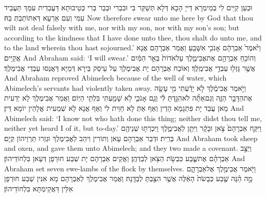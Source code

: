 {וּכְעַן קַיֵּים לִי בְּמֵימְרָא דַּייָ הָכָא דְּלָא תְּשַׁקַּר בִּי וּבִבְרִי וּבְבַר בְּרִי כְּטֵיבוּתָא דַּעֲבַדִית עִמָּךְ תַּעֲבֵיד עִמִּי וְעִם אַרְעָא דְּאִתּוֹתַבְתְּ בַּהּ׃}
{Now therefore swear unto me here by God that thou wilt not deal falsely with me, nor with my son, nor with my son’s son; but according to the kindness that I have done unto thee, thou shalt do unto me, and to the land wherein thou hast sojourned.’}{}
{וַיֹּ֙אמֶר֙ אַבְרָהָ֔ם אָנֹכִ֖י אִשָּׁבֵֽעַ׃}
{וַאֲמַר אַבְרָהָם אֲנָא אֲקַיֵּים׃}
{And Abraham said: ‘I will swear.’}{}
{וְהוֹכִ֥חַ אַבְרָהָ֖ם אֶת\maqqaf אֲבִימֶ֑לֶךְ עַל\maqqaf אֹדוֹת֙ בְּאֵ֣ר הַמַּ֔יִם אֲשֶׁ֥ר גָּזְל֖וּ עַבְדֵ֥י אֲבִימֶֽלֶךְ׃}
{וְאוֹכַח אַבְרָהָם יָת אֲבִימֶלֶךְ עַל עֵיסַק בֵּירָא דְּמַיָּא דַּאֲנַסוּ עַבְדֵי אֲבִימֶלֶךְ׃}
{And Abraham reproved Abimelech because of the well of water, which Abimelech’s servants had violently taken away.}{}
{וַיֹּ֣אמֶר אֲבִימֶ֔לֶךְ לֹ֣א יָדַ֔עְתִּי מִ֥י עָשָׂ֖ה אֶת\maqqaf הַדָּבָ֣ר הַזֶּ֑ה וְגַם\maqqaf אַתָּ֞ה לֹא\maqqaf הִגַּ֣דְתָּ לִּ֗י וְגַ֧ם אָנֹכִ֛י לֹ֥א שָׁמַ֖עְתִּי בִּלְתִּ֥י הַיּֽוֹם׃}
{וַאֲמַר אֲבִימֶלֶךְ לָא יְדַעִית מַאן עֲבַד יָת פִּתְגָמָא הָדֵין וְאַף אַתְּ לָא חַוֵּית לִי וְאַף אֲנָא לָא שְׁמַעִית אֱלָהֵין יוֹמָא דֵּין׃}
{And Abimelech said: ‘I know not who hath done this thing; neither didst thou tell me, neither yet heard I of it, but to-day.’}{}
{וַיִּקַּ֤ח אַבְרָהָם֙ צֹ֣אן וּבָקָ֔ר וַיִּתֵּ֖ן לַאֲבִימֶ֑לֶךְ וַיִּכְרְת֥וּ שְׁנֵיהֶ֖ם בְּרִֽית׃}
{וּדְבַר אַבְרָהָם עָאן וְתוֹרִין וִיהַב לַאֲבִימֶלֶךְ וּגְזַרוּ תַּרְוֵיהוֹן קְיָם׃}
{And Abraham took sheep and oxen, and gave them unto Abimelech; and they two made a covenant.}{}
{וַיַּצֵּ֣ב אַבְרָהָ֗ם אֶת\maqqaf שֶׁ֛בַע כִּבְשֹׂ֥ת הַצֹּ֖אן לְבַדְּהֶֽן׃}
{וַאֲקֵים אַבְרָהָם יָת שְׁבַע חוּרְפָן דְּעָאן בִּלְחוֹדֵיהוֹן׃}
{And Abraham set seven ewe-lambs of the flock by themselves.}{}
{וַיֹּ֥אמֶר אֲבִימֶ֖לֶךְ אֶל\maqqaf אַבְרָהָ֑ם מָ֣ה הֵ֗נָּה שֶׁ֤בַע כְּבָשֹׂת֙ הָאֵ֔לֶּה אֲשֶׁ֥ר הִצַּ֖בְתָּ לְבַדָּֽנָה׃}
{וַאֲמַר אֲבִימֶלֶךְ לְאַבְרָהָם מָא אִנִּין שְׁבַע חוּרְפָן אִלֵּין דַּאֲקֵימְתָּא בִּלְחוֹדֵיהוֹן׃}
